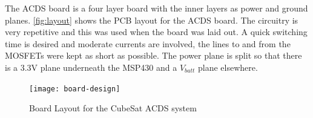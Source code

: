 The \ac{ACDS} board is a four layer board with the inner layers as power and ground planes. \autoref{fig:layout} shows the \ac{PCB} layout for the \ac{ACDS} board. The circuitry is very repetitive and this was used when the board was laid out. A quick switching time is desired and moderate currents are involved, the lines to and from the \acp{MOSFET} were kept as short as possible. The power plane is split so that there is a 3.3V plane underneath the MSP430 and a $V_{batt}$ plane elsewhere.

\begin{figure}[H]
    \centering
    \texttt{[image: board-design]}
    \caption{Board Layout for the CubeSat \acs{ACDS} system}
    \label{fig:layout}
\end{figure}

